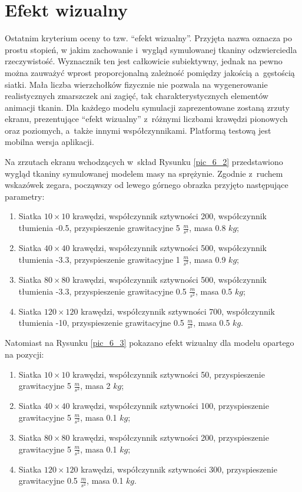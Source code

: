 		
	\section{Efekt wizualny}
	\label{t:wyniki:efektwiz}
		
		Ostatnim kryterium oceny to tzw. ``efekt wizualny''. Przyjęta nazwa oznacza po prostu stopień, w jakim zachowanie i~wygląd symulowanej tkaniny odzwierciedla rzeczywistość. Wyznacznik ten jest całkowicie subiektywny, jednak na pewno można zauważyć wprost proporcjonalną zależność pomiędzy jakością a~gęstością siatki. Mała liczba wierzchołków fizycznie nie pozwala na wygenerowanie realistycznych zmarszczek ani zagięć, tak charakterystycznych elementów animacji tkanin. Dla każdego modelu symulacji zaprezentowane zostaną zrzuty ekranu, prezentujące ``efekt wizualny'' z~różnymi liczbami krawędzi pionowych oraz poziomych, a~także innymi współczynnikami. Platformą testową jest mobilna wersja aplikacji.
		
		Na zrzutach ekranu wchodzących w~skład Rysunku \ref{pic_6_2} przedstawiono wygląd tkaniny symulowanej modelem masy na sprężynie. Zgodnie z~ruchem wskazówek zegara, począwszy od lewego górnego obrazka przyjęto następujące parametry:
		
		\begin{enumerate}
			\item Siatka \(10 \times 10\) krawędzi, współczynnik sztywności 200, współczynnik tłumienia -0.5, przyspieszenie grawitacyjne 5 \( \frac{m}{s^2} \), masa 0.8 \(kg\);
			\item Siatka \(40 \times 40\) krawędzi, współczynnik sztywności 500, współczynnik tłumienia -3.3, przyspieszenie grawitacyjne 1 \( \frac{m}{s^2} \), masa 0.9 \(kg\);
			\item Siatka \(80 \times 80\) krawędzi, współczynnik sztywności 500, współczynnik tłumienia -3.3, przyspieszenie grawitacyjne 0.5 \( \frac{m}{s^2} \), masa 0.5 \(kg\);
			\item Siatka \(120 \times 120\) krawędzi, współczynnik sztywności 700, współczynnik tłumienia -10, przyspieszenie grawitacyjne 0.5 \( \frac{m}{s^2} \), masa 0.5 \(kg\).
		\end{enumerate}
		
		Natomiast na Rysunku \ref{pic_6_3} pokazano efekt wizualny dla modelu opartego na pozycji:
		
		\begin{enumerate}
			\item Siatka \(10 \times 10\) krawędzi, współczynnik sztywności 50, przyspieszenie grawitacyjne 5 \( \frac{m}{s^2} \), masa 2 \(kg\);
			\item Siatka \(40 \times 40\) krawędzi, współczynnik sztywności 100, przyspieszenie grawitacyjne 5 \( \frac{m}{s^2} \), masa 0.1 \(kg\);
			\item Siatka \(80 \times 80\) krawędzi, współczynnik sztywności 200, przyspieszenie grawitacyjne 5 \( \frac{m}{s^2} \), masa 0.1 \(kg\);
			\item Siatka \(120 \times 120\) krawędzi, współczynnik sztywności 300, przyspieszenie grawitacyjne 0.5 \( \frac{m}{s^2} \), masa 0.1 \(kg\).
		\end{enumerate}
		

